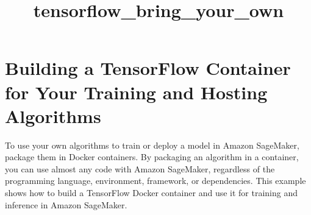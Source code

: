 \documentclass[11pt]{article}
\title{tensorflow\_bring\_your\_own}
\begin{document}
    
    
    \maketitle
    
    

    
    \section{Building a TensorFlow Container for Your Training and Hosting
Algorithms}\label{building-a-tensorflow-container-for-your-training-and-hosting-algorithms}

To use your own algorithms to train or deploy a model in Amazon
SageMaker, package them in Docker containers. By packaging an algorithm
in a container, you can use almost any code with Amazon SageMaker,
regardless of the programming language, environment, framework, or
dependencies. This example shows how to build a TensorFlow Docker
container and use it for training and inference in Amazon SageMaker.
\end{document}
